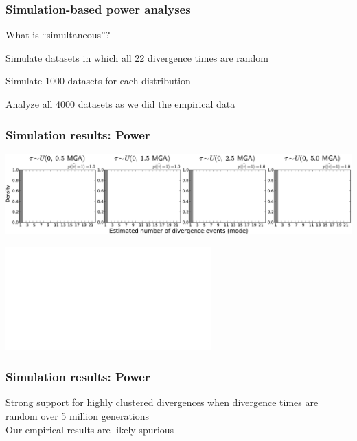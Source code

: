 \begin{frame}
    \frametitle{Simulation-based power analyses}
    What is ``simultaneous''?
    \begin{myitemize}
        \item<2-> Simulate datasets in which all 22 divergence times are random
        \item<4-> Simulate 1000 datasets for each \divTime{} distribution
        \item<4-> Analyze all 4000 datasets as we did the empirical data
    \end{myitemize}
\end{frame}

\begin{frame}[t]
    \frametitle{Simulation results: Power}
    \vspace{1cm}
        \centerline{
        \includegraphics[width=\textwidth]{images/old-sims_power_psi_mode.pdf}}
        \vspace{0mm}
        \centerline{
        \includegraphics<2>[width=\textwidth]{images/old-sims_power_psi_prob_headless.pdf}}
\end{frame}

\begin{frame}
    \frametitle{Simulation results: Power}
    Strong support for highly clustered divergences when divergence times
    are random over 5 million generations \\
    \bigskip
    Our empirical results are likely spurious
\end{frame}


